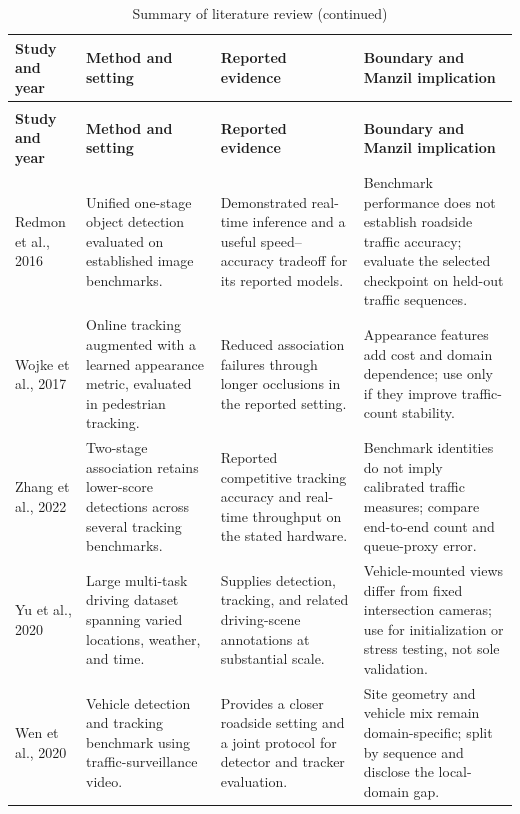 \begin{longtable}{P{0.18\textwidth}P{0.23\textwidth}P{0.24\textwidth}P{0.20\textwidth}}
\caption{Summary of literature review}\label{tab:literature-summary}\\
\toprule
\textbf{Study and year} & \textbf{Method and setting} & \textbf{Reported evidence} & \textbf{Boundary and Manzil implication}\\
\midrule\endfirsthead
\caption[]{Summary of literature review (continued)}\\
\toprule
\textbf{Study and year} & \textbf{Method and setting} & \textbf{Reported evidence} & \textbf{Boundary and Manzil implication}\\
\midrule\endhead
Redmon et al., 2016 \cite{redmon2016yolo} & Unified one-stage object detection evaluated on established image benchmarks. & Demonstrated real-time inference and a useful speed--accuracy tradeoff for its reported models. & Benchmark performance does not establish roadside traffic accuracy; evaluate the selected checkpoint on held-out traffic sequences.\\
Wojke et al., 2017 \cite{wojke2017deepsort} & Online tracking augmented with a learned appearance metric, evaluated in pedestrian tracking. & Reduced association failures through longer occlusions in the reported setting. & Appearance features add cost and domain dependence; use only if they improve traffic-count stability.\\
Zhang et al., 2022 \cite{zhang2022bytetrack} & Two-stage association retains lower-score detections across several tracking benchmarks. & Reported competitive tracking accuracy and real-time throughput on the stated hardware. & Benchmark identities do not imply calibrated traffic measures; compare end-to-end count and queue-proxy error.\\
Yu et al., 2020 \cite{yu2020bdd100k} & Large multi-task driving dataset spanning varied locations, weather, and time. & Supplies detection, tracking, and related driving-scene annotations at substantial scale. & Vehicle-mounted views differ from fixed intersection cameras; use for initialization or stress testing, not sole validation.\\
Wen et al., 2020 \cite{wen2020uadetrac} & Vehicle detection and tracking benchmark using traffic-surveillance video. & Provides a closer roadside setting and a joint protocol for detector and tracker evaluation. & Site geometry and vehicle mix remain domain-specific; split by sequence and disclose the local-domain gap.\\

\end{longtable}
